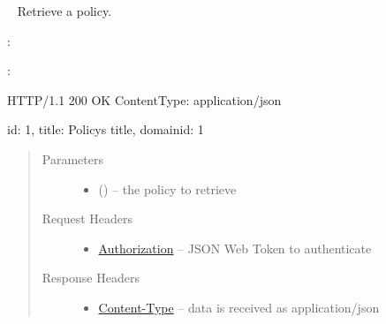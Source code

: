 \documentclass[letterpaper,10pt,english]{sphinxmanual}
\begin{document}
\begin{fulllineitems}
\label{\detokenize{resources/policy:get--policies-(policy_id)}}~
Retrieve a policy.

:

\begin{sphinxVerbatim}[commandchars=\\\{\}]
  
 
 
\end{sphinxVerbatim}

:

\begin{sphinxVerbatim}[commandchars=\\\{\}]
HTTP/1.1 200 OK
Content\PYGZhy{}Type: application/json

\PYGZob{}
    \PYGZsq{}id\PYGZsq{}: 1,
    \PYGZsq{}title\PYGZsq{}: \PYGZsq{}Policy\PYGZsq{}s title\PYGZsq{},
    \PYGZsq{}domain\PYGZus{}id\PYGZsq{}: 1
\PYGZcb{}
\end{sphinxVerbatim}
\begin{quote}\begin{description}
\item[{Parameters}] \leavevmode\begin{itemize}
\item {} 
 () -- the policy to retrieve

\end{itemize}

\item[{Request Headers}] \leavevmode\begin{itemize}
\item {} 
\href{http://tools.ietf.org/html/rfc7235\#section-4.2}{Authorization} -- JSON Web Token to authenticate

\end{itemize}

\item[{Response Headers}] \leavevmode\begin{itemize}
\item {} 
\href{http://tools.ietf.org/html/rfc7231\#section-3.1.1.5}{Content-Type} -- data is received as application/json


\end{itemize}
\end{description}
\end{quote}
\end{fulllineitems}
\end{document}

